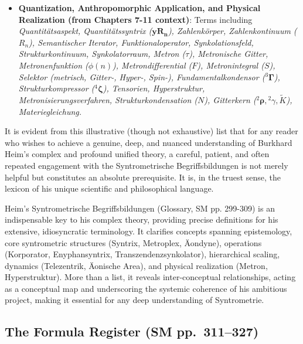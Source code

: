 \documentclass[
    12pt,              %
    a4paper,           %
    headings=normal,   %
    twoside=true,      %
    BCOR=8mm,          %
]{scrbook}
\begin{document}
\begin{itemize}
\begin{itemize}
        \item \textbf{Quantization, Anthropomorphic Application, and Physical Realization (from Chapters 7-11 context)}: Terms including \textit{Quantitätsaspekt, Quantitätssyntrix (\( \mathbf{yR_n} \)), Zahlenkörper, Zahlenkontinuum (\(R_n\)), Semantischer Iterator, Funktionaloperator, Synkolationsfeld, Strukturkontinuum, Synkolatorraum, Metron (\(\tau\)), Metronische Gitter, Metronenfunktion (\(\phi(n)\)), Metrondifferential (\( F \)), Metronintegral (\( S \)), Selektor (metrisch, Gitter-, Hyper-, Spin-), Fundamentalkondensor (\( {}^3\bm{\Gamma} \)), Strukturkompressor (\( {}^4\bm{\zeta} \)), Tensorien, Hyperstruktur, Metronisierungsverfahren, Strukturkondensation (\(N\)), Gitterkern (\( {}^2\bm{\rho}, {}^2\gamma, \tilde{K} \)), Materiegleichung.}
    \end{itemize}
    It is evident from this illustrative (though not exhaustive) list that for any reader who wishes to achieve a genuine, deep, and nuanced understanding of Burkhard Heim's complex and profound unified theory, a careful, patient, and often repeated engagement with the Syntrometrische Begriffsbildungen is not merely helpful but constitutes an absolute prerequisite. It is, in the truest sense, the lexicon of his unique scientific and philosophical language.
\end{itemize}
Heim's Syntrometrische Begriffsbildungen (Glossary, SM pp. 299-309) is an indispensable key to his complex theory, providing precise definitions for his extensive, idiosyncratic terminology. It clarifies concepts spanning epistemology, core syntrometric structures (Syntrix, Metroplex, Äondyne), operations (Korporator, Enyphansyntrix, Transzendenzsynkolator), hierarchical scaling, dynamics (Telezentrik, Äonische Area), and physical realization (Metron, Hyperstruktur). More than a list, it reveals inter-conceptual relationships, acting as a conceptual map and underscoring the systemic coherence of his ambitious project, making it essential for any deep understanding of Syntrometrie.

\subsection*{The Formula Register (SM pp.\ 311--327)}
\label{sec:formula_register_final}
\end{document}
